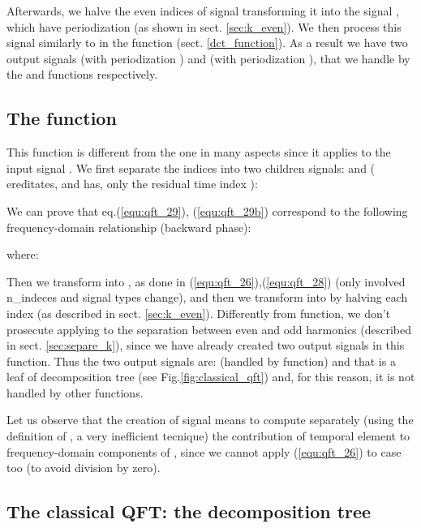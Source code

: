 \documentclass[a4paper,10pt]{article}
\begin{document}
Afterwards, we halve the even  indices of signal  transforming it into the signal , which have periodization  (as shown in sect. \ref{sec:k_even}). 
We then process this signal similarly to  in the  function (sect. \ref{dct_function}). 
As a result we have two output signals  (with periodization ) and  (with periodization ), that we handle by the  and  functions respectively. 



\subsection{The  function}

This function is different from the  one in many aspects since it applies to the input signal . 
We first separate the  indices into two children signals:  and  ( ereditates, and has, only 
the residual time index ):
 

We can prove that eq.(\ref{equ:qft_29}), (\ref{equ:qft_29b}) correspond to the following frequency-domain relationship (backward phase):

where:

Then we transform  into , as done in (\ref{equ:qft_26}),(\ref{equ:qft_28}) (only involved n\_indeces and signal types change), and then we transform  into  by halving each  index (as described in sect. \ref{sec:k_even}).
Differently from  function, we don't prosecute applying to  the separation between even and odd harmonics (described in sect. \ref{sec:separe_k}), since we have already created two output signals in this function.
Thus the two output signals are:  (handled by  function) and  that is a leaf of decomposition tree (see 
Fig.\ref{fig:classical_qft}) and, for this reason, it is not handled by other functions.
 
Let us observe that the creation of  signal means to compute separately (using the definition of , a very inefficient tecnique) the contribution of  temporal element to frequency-domain components of , since we cannot apply (\ref{equ:qft_26}) to  case too (to avoid division by zero).




\subsection{The classical QFT: the decomposition tree}
\end{document}
